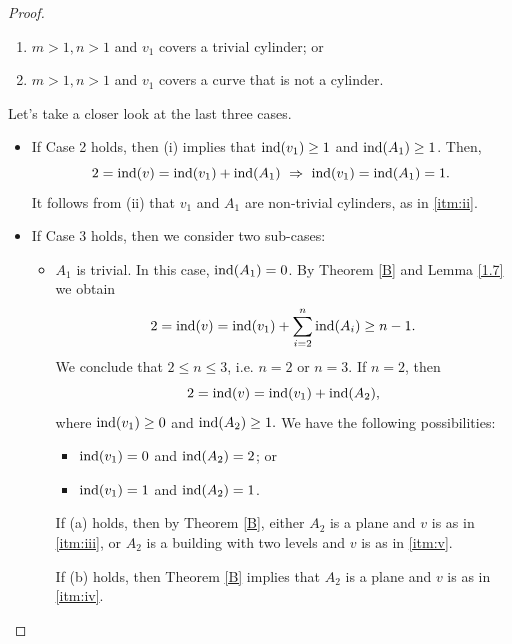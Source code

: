 \documentclass{amsart}
\newcommand{\ind}{\textnormal{ind}}
\begin{document}
\begin{proof}
\begin{enumerate}
\item $m>1, n>1$ and $v_1$ covers a trivial cylinder; or

\item $m>1, n>1$ and $v_1$ covers a curve that is not a cylinder.
\end{enumerate}

Let's take a closer look at the last three cases.
\begin{itemize}
\item If Case 2 holds, then (i) implies that $\ind(v_1)\geq 1$ and $\ind(A_1)\geq 1$. Then,
$$2=\ind(v)=\ind(v_1)+\ind(A_1) \,\, \Rightarrow \,\, \ind(v_1)=\ind(A_1)=1.$$
It follows from (ii) that $v_1$ and $A_1$ are non-trivial cylinders, as in \ref{itm:ii}.

\item If Case 3 holds, then we  consider two sub-cases: 
\begin{itemize}
 \item $A_1$ is trivial. In this case,  $\ind(A_1)=0$. By Theorem \ref{B} and Lemma \ref{1.7} we obtain
 $$2=\ind(v)=\ind(v_1)+\sum_{i=2}^n \ind(A_i) \geq n-1.$$
 We conclude that
 $2 \leq n \leq 3 $, i.e. $n=2$ or  $n=3$.
 If $n=2$, then
 \begin{equation}
 2=\ind(v)=\ind(v_1)+\ind(A_2),
 \label{eq:n3}
 \end{equation}
 where $\ind(v_1)\geq 0$ and $\ind(A_2) \geq 1.$
We have the following possibilities:
 \begin{itemize}
 \item[(a)] $\ind(v_1)=0$ and $\ind(A_2)=2$; or
 \item[(b)] $\ind(v_1)=1$ and $\ind(A_2)=1$.
 \end{itemize}
 
 If (a) holds, then by Theorem \ref{B}, either $A_2$ is a plane and $v$ is as in \ref{itm:iii}, or $A_2$ is a building with two levels and $v$ is as in  \ref{itm:v}.
 
 If (b) holds, then  Theorem \ref{B} implies that $A_2$ is a plane and $v$ is as in \ref{itm:iv}.
 

\end{itemize}
\end{itemize}
\end{proof}
\end{document}
